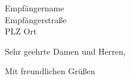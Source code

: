\documentclass[
    fontsize=12pt,              %
    paper=a4,                   %
    parskip=half,               %
    footnotes=true,             %
    firsthead=true,             %
    firstfoot=true,             %
    locfield=wide,              %
    enlargefirstpage,           %
    DIN                         %
]{scrlttr2}
\begin{document}
\begin{letter}{Empfängername\\Empfängerstraße\\PLZ Ort}





\opening{Sehr geehrte Damen und Herren,}

\lipsum[1-5]

\closing{Mit freundlichen Grüßen}

\encl{}

\end{letter}
\end{document}
